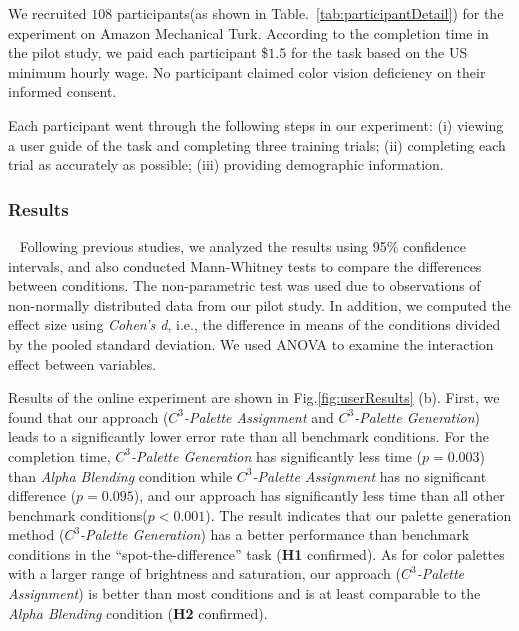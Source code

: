 \vspace{.3em}
We recruited $108$ participants(as shown in Table.~\ref{tab:participantDetail}) for the experiment on Amazon Mechanical Turk.
According to the completion time in the pilot study, we paid each participant \$$1.5$ for the task based on the US minimum hourly wage.
No participant claimed color vision deficiency on their informed consent.

\vspace{.3em}
Each participant went through the following steps in our experiment: (i) viewing a user guide of the task and completing three training trials; (ii) completing each trial as accurately as possible; (iii) providing demographic information.

\subsubsection{Results}
\
\newline
Following previous studies, we analyzed the results using 95\% confidence intervals, and also conducted Mann-Whitney tests to compare the differences between conditions. The non-parametric test was used due to observations of non-normally distributed data from our pilot study. In addition, we computed the effect size using \emph{Cohen's d}, i.e., the difference in means of the conditions divided by the pooled standard deviation. We used ANOVA to examine the interaction effect between variables.


Results of the online experiment are shown in Fig.\ref{fig:userResults} (b).
First, we found that our approach (\emph{$C^3$-Palette Assignment} and \emph{$C^3$-Palette Generation}) leads to a significantly lower error rate than all benchmark conditions. For the completion time, \emph{$C^3$-Palette Generation} has significantly less time (\emph{$p = 0.003$}) than \emph{Alpha Blending} condition while \emph{$C^3$-Palette Assignment} has no significant difference (\emph{$p = 0.095$}), and our approach has significantly less time than all other benchmark conditions(\emph{$p < 0.001$}). The result indicates that our palette generation method (\emph{$C^3$-Palette Generation}) has a better performance than benchmark conditions in the ``spot-the-difference'' task (\textbf{H1} confirmed). As for color palettes with a larger range of brightness and saturation, our approach (\emph{$C^3$-Palette Assignment}) is better than most conditions and is at least comparable to the \emph{Alpha Blending} condition (\textbf{H2} confirmed).


